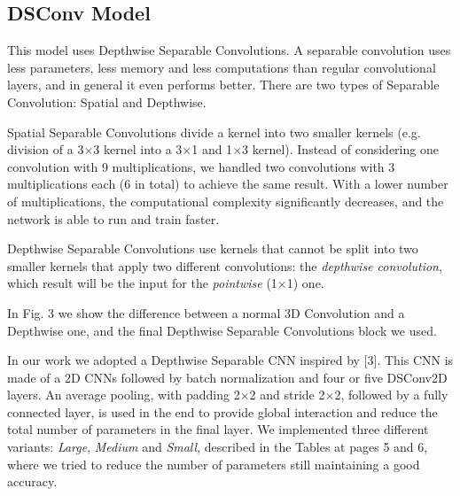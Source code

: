 \documentclass[conference]{IEEEtran}
\begin{document}
\subsection{DSConv Model}
This model uses Depthwise Separable Convolutions. A separable convolution uses less parameters, less memory and less computations than regular convolutional layers, and in general it even performs better.
There are two types of Separable Convolution: Spatial and Depthwise.

Spatial Separable Convolutions divide a kernel into two smaller kernels (e.g. division of a 3$\times$3 kernel into a 3$\times$1 and 1$\times$3 kernel). Instead of considering one convolution with 9 multiplications, we handled two convolutions with 3 multiplications each (6 in total) to achieve the same result. With a lower number of multiplications, the computational complexity significantly decreases, and the network is able to run and train faster.

Depthwise Separable Convolutions use kernels that cannot be split into two smaller kernels that apply two different convolutions: the \textit{depthwise convolution}, which result will be the input for the \textit{pointwise} (1$\times$1) one.

In Fig. 3 we show the difference between a normal 3D Convolution and a Depthwise one, and the final Depthwise Separable Convolutions block we used. 

In our work we adopted a Depthwise Separable CNN inspired by [3]. This CNN is made of a 2D CNNs followed by batch normalization and four or five DSConv2D layers. An average pooling, with padding 2$\times$2 and stride 2$\times$2, followed by a fully connected layer, is used in the end to provide global interaction and reduce the total number of parameters in the final layer.
We implemented three different variants: \textit{Large}, \textit{Medium} and \textit{Small}, described in the Tables at pages 5 and 6, where we tried to reduce the number of parameters still maintaining a good accuracy.
\end{document}
